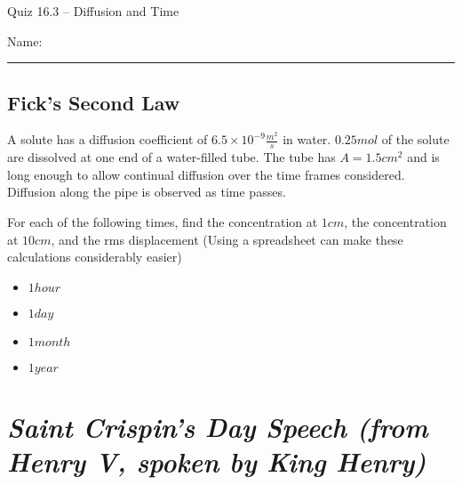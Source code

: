 \documentclass[11pt, letterpaper]{memoir}
\begin{document}
	\begin{center}
		{\large Quiz 16.3 -- Diffusion and Time}
	\end{center}
	{\large Name: \rule[-1mm]{4in}{.1pt} 


\subsection*{Fick's Second Law}
A solute has a diffusion coefficient of $6.5\times10^{-9}\frac{m^2}{s}$ in water. $0.25 mol$ of the solute are dissolved at one end of a water-filled tube. The tube has $A=1.5 cm^2$ and is long enough to allow continual diffusion over the time frames considered. Diffusion along the pipe is observed as time passes.

\noindent For each of the following times, find the concentration at $1cm$, the concentration at $10cm$, and the rms displacement (Using a spreadsheet can make these calculations considerably easier)
\begin{itemize}
	\item $1hour$
	
	\vspace{8em}
	\item $1day$
	
	\vspace{8em}
	\item $1month$
	
	\vspace{8em}
	\item $1year$
\end{itemize}
\newpage
\pagestyle{empty}
\addtocounter{page}{-1}	
\section*{\emph{Saint Crispin's Day Speech (from \emph{Henry V}, spoken by King Henry)}}
}
\end{document}
